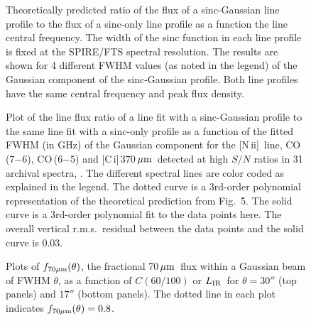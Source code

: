 \documentclass[preprint]{aastex}
\newcommand{\um}{\mbox{$\,\mu{\rm m}$}}
\newcommand{\CI}{[C\,{\sc i}]}
\newcommand{\LIR}{\mbox{$L_{\rm IR}$}}
\newcommand{\NII}{\mbox{[N\,{\sc ii}]}}
\begin{document}
\begin{figure}
\centering
\caption{
Theoretically predicted ratio of the flux of a sinc-Gaussian line profile to the flux of a 
sinc-only line profile as a function the line central frequency.  The width of the sinc 
function in each line profile is fixed at the SPIRE/FTS spectral resolution. The results 
are shown for 4 different FWHM values (as noted in the legend) of the Gaussian component 
of the sinc-Gaussian profile. Both line profiles have the same central frequency and peak
flux density.
}
\label{Fig5}
\end{figure}

\clearpage




\begin{figure}
\centering
\caption{
Plot of the line flux ratio of a line fit with a sinc-Gaussian profile to the same line fit
with a sinc-only profile as a function of the fitted FWHM (in GHz) of the Gaussian component
for the \NII\ line, CO\,(7$-$6), CO\,(6$-$5) and \CI\,370\um\ detected at high $S/N$ ratios 
in 31 archival spectra, .  The different spectral lines are color coded as explained in 
the legend.  The dotted curve is a 3rd-order polynomial representation 
of the theoretical prediction from Fig.~5. The solid curve is a 3rd-order polynomial fit to 
the data points here.  The overall vertical r.m.s.~residual between the data points and
the solid curve is 0.03.
}
\label{Fig6}
\end{figure}
\clearpage



\begin{figure}
\centering
{}
\caption{
Plots of $f_{70\mu{\rm m}}(\theta)$, the fractional 70\um\ flux within a Gaussian beam of FWHM $\theta$,
as a function of $C(60/100)$ or \LIR\ for $\theta = 30''$ (top panels) and $17''$ (bottom panels).
The dotted line in each plot indicates $f_{70\mu{\rm m}}(\theta) = 0.8$.
}
\label{Fig7}
\end{figure}
\clearpage
\end{document}

